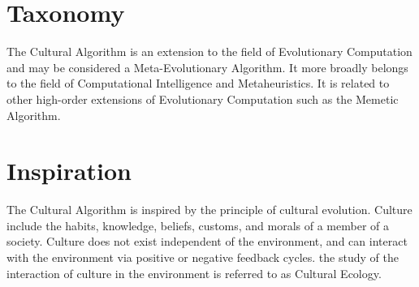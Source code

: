 \documentclass[a4paper, 11pt]{article}
\begin{document}
\section{Taxonomy}
\label{sec:taxonomy}
The Cultural Algorithm is an extension to the field of Evolutionary Computation and may be considered a Meta-Evolutionary Algorithm. It more broadly belongs to the field of Computational Intelligence and Metaheuristics.
It is related to other high-order extensions of Evolutionary Computation such as the Memetic Algorithm.

\section{Inspiration}
\label{sec:inspiration}
The Cultural Algorithm is inspired by the principle of cultural evolution.
Culture include the habits, knowledge, beliefs, customs, and morals of a member of a society. Culture does not exist independent of the environment, and can interact with the environment via positive or negative feedback cycles. the study of the interaction of culture in the environment is referred to as Cultural Ecology.
\end{document}
